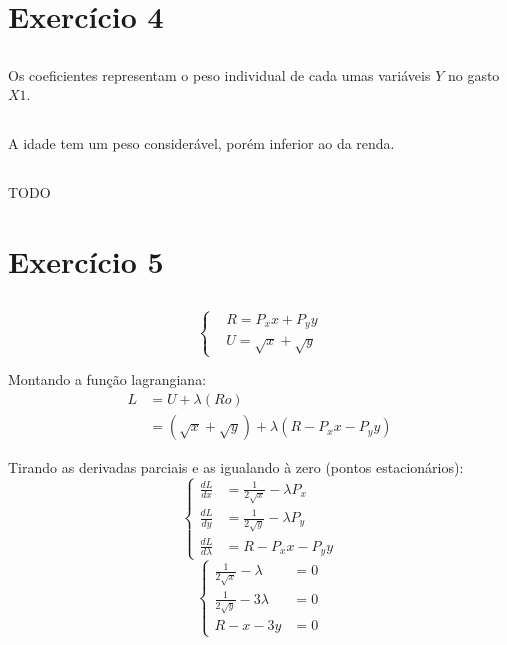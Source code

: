 \documentclass{article}
\begin{document}
\section{Exercício 4}
\subsection{}

Os coeficientes representam o peso individual de cada umas variáveis \(Y\) no
gasto \(X1\).

\subsection{}

A idade tem um peso considerável, porém inferior ao da renda.

\subsection{}

TODO


\section{Exercício 5}
\subsection{}

\[
	\left\{
	\begin{aligned}
		 & R = P_x x + P_y y       \\
		 & U = \sqrt{x} + \sqrt{y}
	\end{aligned}
	\right.
\]

Montando a função lagrangiana:
\[
	\begin{aligned}
		L & = U + \lambda(Ro)                                    \\
		  & = (\sqrt{x} + \sqrt{y}) + \lambda(R - P_x x - P_y y)
	\end{aligned}
\]

Tirando as derivadas parciais e as igualando à zero (pontos estacionários):
\[
	\left\{
	\begin{aligned}
		\frac{dL}{dx}       & = \frac{1}{2\sqrt{x}} - \lambda P_x \\
		\frac{dL}{dy}       & = \frac{1}{2\sqrt{y}} - \lambda P_y \\
		\frac{dL}{d\lambda} & =  R - P_x x - P_y y
	\end{aligned}
	\right.
\]
\[
	\left\{
	\begin{aligned}
		\frac{1}{2\sqrt{x}} - \lambda  & = 0 \\
		\frac{1}{2\sqrt{y}} - 3\lambda & = 0 \\
		R - x - 3y                     & = 0
	\end{aligned}
	\right.
\]
\end{document}

